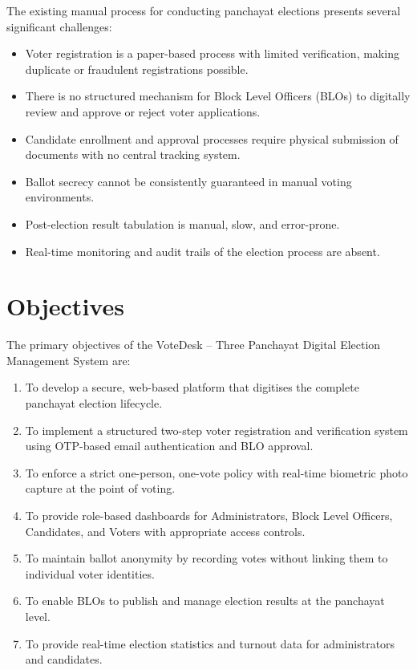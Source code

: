 The existing manual process for conducting panchayat elections presents several significant challenges:

\begin{itemize}
    \item Voter registration is a paper-based process with limited verification, making duplicate or fraudulent registrations possible.
    \item There is no structured mechanism for Block Level Officers (BLOs) to digitally review and approve or reject voter applications.
    \item Candidate enrollment and approval processes require physical submission of documents with no central tracking system.
    \item Ballot secrecy cannot be consistently guaranteed in manual voting environments.
    \item Post-election result tabulation is manual, slow, and error-prone.
    \item Real-time monitoring and audit trails of the election process are absent.
\end{itemize}

\section{Objectives}

The primary objectives of the VoteDesk -- Three Panchayat Digital Election Management System are:

\begin{enumerate}
    \item To develop a secure, web-based platform that digitises the complete panchayat election lifecycle.
    \item To implement a structured two-step voter registration and verification system using OTP-based email authentication and BLO approval.
    \item To enforce a strict one-person, one-vote policy with real-time biometric photo capture at the point of voting.
    \item To provide role-based dashboards for Administrators, Block Level Officers, Candidates, and Voters with appropriate access controls.
    \item To maintain ballot anonymity by recording votes without linking them to individual voter identities.
    \item To enable BLOs to publish and manage election results at the panchayat level.
    \item To provide real-time election statistics and turnout data for administrators and candidates.
\end{enumerate}

